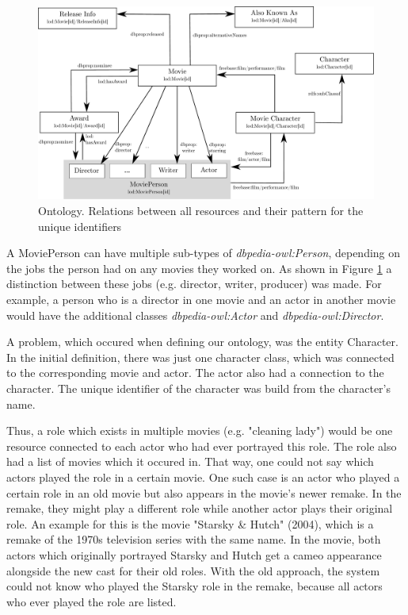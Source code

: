 \begin{figure}[h!]
\includegraphics[width=\textwidth]{images/ontology.pdf}
\caption{Ontology. Relations between all resources and their pattern for the unique identifiers}
\label{fig_ontology}
\end{figure}

A MoviePerson can have multiple sub-types of \textit{dbpedia-owl:Person}, depending on the jobs the person had on any movies they worked on.
As shown in Figure \ref{fig_ontology} a distinction between these jobs (e.g. director, writer, producer) was made.
For example, a person who is a director in one movie and an actor in another movie would have the additional classes \textit{dbpedia-owl:Actor} and \textit{dbpedia-owl:Director}.

A problem, which occured when defining our ontology, was the entity Character.
In the initial definition, there was just one character class, which was connected to the corresponding movie and actor.
The actor also had a connection to the character.
The unique identifier of the character was build from the character's name.

Thus, a role which exists in multiple movies (e.g. "cleaning lady") would be one resource connected to each actor who had ever portrayed this role.
The role also had a list of movies which it occured in.
That way, one could not say which actors played the role in a certain movie.
One such case is an actor who played a certain role in an old movie but also appears in the movie's newer remake.
In the remake, they might play a different role while another actor plays their original role.
An example for this is the movie "Starsky \& Hutch" (2004), which is a remake of the 1970s television series with the same name.
In the movie, both actors which originally portrayed Starsky and Hutch get a cameo appearance alongside the new cast for their old roles.
With the old approach, the system could not know who played the Starsky role in the remake, because all actors who ever played the role are listed.


